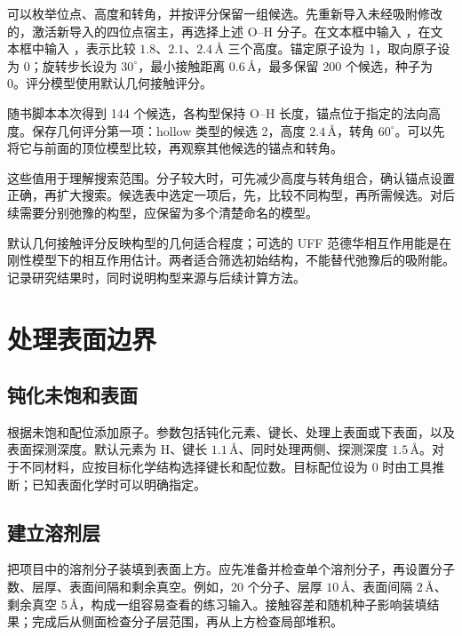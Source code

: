可以枚举位点、高度和转角，并按评分保留一组候选。先重新导入未经吸附修改的，激活新导入的四位点宿主，再选择上述 O--H 分子。在文本框中输入 ，在文本框中输入 ，表示比较 $1.8$、$2.1$、$2.4\,\text{\AA}$ 三个高度。锚定原子设为 1，取向原子设为 0；旋转步长设为 $30^\circ$，最小接触距离 $0.6\,\text{\AA}$，最多保留 200 个候选，种子为 0。评分模型使用默认几何接触评分。

随书脚本本次得到 144 个候选，各构型保持 O--H 长度，锚点位于指定的法向高度。保存几何评分第一项：hollow 类型的候选 2，高度 $2.4\,\text{\AA}$，转角 $60^\circ$。可以先将它与前面的顶位模型比较，再观察其他候选的锚点和转角。

这些值用于理解搜索范围。分子较大时，可先减少高度与转角组合，确认锚点设置正确，再扩大搜索。候选表中选定一项后，先，比较不同构型，再所需候选。对后续需要分别弛豫的构型，应保留为多个清楚命名的模型。

默认几何接触评分反映构型的几何适合程度；可选的 UFF 范德华相互作用能是在刚性模型下的相互作用估计。两者适合筛选初始结构，不能替代弛豫后的吸附能。记录研究结果时，同时说明构型来源与后续计算方法。

\section{处理表面边界}

\subsection{钝化未饱和表面}

根据未饱和配位添加原子。参数包括钝化元素、键长、处理上表面或下表面，以及表面探测深度。默认元素为 H、键长 $1.1\,\text{\AA}$、同时处理两侧、探测深度 $1.5\,\text{\AA}$。对于不同材料，应按目标化学结构选择键长和配位数。目标配位设为 0 时由工具推断；已知表面化学时可以明确指定。

\subsection{建立溶剂层}

把项目中的溶剂分子装填到表面上方。应先准备并检查单个溶剂分子，再设置分子数、层厚、表面间隔和剩余真空。例如，20 个分子、层厚 $10\,\text{\AA}$、表面间隔 $2\,\text{\AA}$、剩余真空 $5\,\text{\AA}$，构成一组容易查看的练习输入。接触容差和随机种子影响装填结果；完成后从侧面检查分子层范围，再从上方检查局部堆积。


